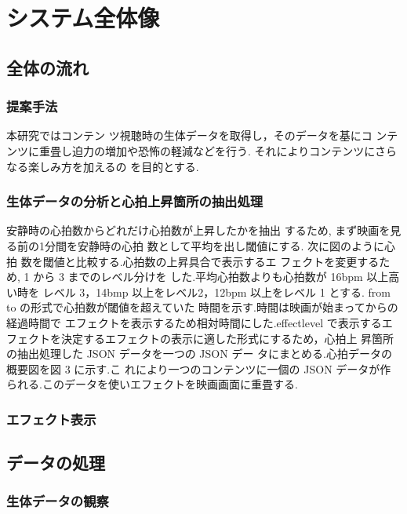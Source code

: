 \chapter{システム全体像}
\thispagestyle{myheadings}

\section{全体の流れ}

\subsection{提案手法}
本研究ではコンテン ツ視聴時の生体データを取得し，そのデータを基にコ ンテンツに重畳し迫力の増加や恐怖の軽減などを行う. それによりコンテンツにさらなる楽しみ方を加えるの を目的とする.

\subsection{生体データの分析と心拍上昇箇所の抽出処理}
安静時の心拍数からどれだけ心拍数が上昇したかを抽出 するため,  まず映画を見る前の1分間を安静時の心拍 数として平均を出し閾値にする. 次に図のように心拍 数を閾値と比較する.心拍数の上昇具合で表示するエ フェクトを変更するため,  1 から 3 までのレベル分けを した.平均心拍数よりも心拍数が 16bpm 以上高い時を レベル 3，14bmp 以上をレベル2，12bpm 以上をレベル 1 とする. from to の形式で心拍数が閾値を超えていた 時間を示す.時間は映画が始まってからの経過時間で エフェクトを表示するため相対時間にした.effectlevel で表示するエフェクトを決定するエフェクトの表示に適した形式にするため，心拍上 昇箇所の抽出処理した JSON データを一つの JSON デー タにまとめる.心拍データの概要図を図 3 に示す.こ れにより一つのコンテンツに一個の JSON データが作 られる.このデータを使いエフェクトを映画画面に重畳する.

\subsection{エフェクト表示}

\section{データの処理}

\subsection{生体データの観察}

